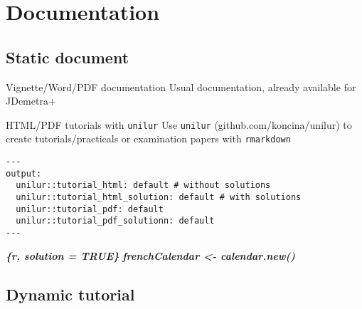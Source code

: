 \documentclass[10pt,xcolor=table,color={dvipsnames,usenames},ignorenonframetext,usepdftitle=false,french]{beamer}
\newenvironment{Shaded}{\begin{snugshade}}{\end{snugshade}}
\newcommand{\InformationTok}[1]{\textcolor[rgb]{0.56,0.35,0.01}{\textbf{\textit{#1}}}}
\begin{document}
\hypertarget{documentation}{%
\section{Documentation}\label{documentation}}

\hypertarget{static-document}{%
\subsection{Static document}\label{static-document}}

\begin{frame}{Vignette/Word/PDF documentation}
\protect\hypertarget{vignettewordpdf-documentation}{}
Usual documentation, already available for JDemetra+

\end{frame}

\begin{frame}{HTML/PDF tutorials with
\texttt{unilur}}
\protect\hypertarget{htmlpdf-tutorials-with-unilur}{}
Use \texttt{unilur} (github.com/koncina/unilur) to create
tutorials/practicals or examination papers with \texttt{rmarkdown}

\begin{verbatim}
---
output:
  unilur::tutorial_html: default # without solutions
  unilur::tutorial_html_solution: default # with solutions
  unilur::tutorial_pdf: default
  unilur::tutorial_pdf_solutionn: default
---
\end{verbatim}

\begin{Shaded}
\begin{Highlighting}[]
\InformationTok{\textasciigrave{}\textasciigrave{}\textasciigrave{}\{r, solution = TRUE\}}
\InformationTok{frenchCalendar \textless{}{-} calendar.new()}
\InformationTok{\textasciigrave{}\textasciigrave{}\textasciigrave{}}
\end{Highlighting}
\end{Shaded}

\end{frame}

\hypertarget{dynamic-tutorial}{%
\subsection{Dynamic tutorial}\label{dynamic-tutorial}}
\end{document}
